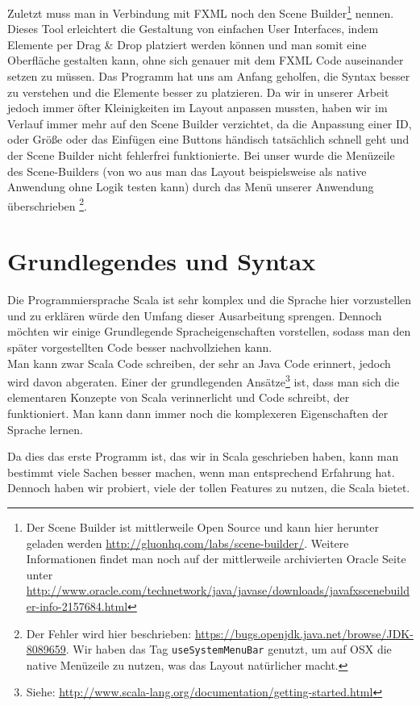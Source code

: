 Zuletzt muss man in Verbindung mit FXML noch den Scene Builder\footnote{Der Scene Builder ist mittlerweile Open Source und kann hier herunter geladen werden \url{http://gluonhq.com/labs/scene-builder/}. Weitere Informationen findet man noch auf der mittlerweile archivierten Oracle Seite unter \url{http://www.oracle.com/technetwork/java/javase/downloads/javafxscenebuilder-info-2157684.html}} nennen. Dieses Tool erleichtert die Gestaltung von einfachen User Interfaces, indem Elemente per Drag \& Drop platziert werden können und man somit eine Oberfläche gestalten kann, ohne sich genauer mit dem FXML Code auseinander setzen zu müssen. Das Programm hat uns am Anfang geholfen, die Syntax besser zu verstehen und die Elemente besser zu platzieren. Da wir in unserer Arbeit jedoch immer öfter Kleinigkeiten im Layout anpassen mussten, haben wir im Verlauf immer mehr auf den Scene Builder verzichtet, da die Anpassung einer ID, oder Größe oder das Einfügen eine Buttons händisch tatsächlich schnell geht und der Scene Builder nicht fehlerfrei funktionierte. Bei unser wurde die Menüzeile des Scene-Builders (von wo aus man das Layout beispielsweise als native Anwendung ohne Logik testen kann) durch das Menü unserer Anwendung überschrieben \footnote{Der Fehler wird hier beschrieben: \url{https://bugs.openjdk.java.net/browse/JDK-8089659}. Wir haben das Tag \texttt{useSystemMenuBar} genutzt, um auf OSX die native Menüzeile zu nutzen, was das Layout natürlicher macht.}.

\section{Grundlegendes und Syntax}
Die Programmiersprache Scala ist sehr komplex und die Sprache hier vorzustellen und zu erklären würde den Umfang dieser Ausarbeitung sprengen. Dennoch möchten wir einige Grundlegende Spracheigenschaften vorstellen, sodass man den später vorgestellten Code besser nachvollziehen kann.\\
Man kann zwar Scala Code schreiben, der sehr an Java Code erinnert, jedoch wird davon abgeraten. Einer der grundlegenden Ansätze\footnote{Siehe: \url{http://www.scala-lang.org/documentation/getting-started.html}} ist, dass man sich die elementaren Konzepte von Scala verinnerlicht und Code schreibt, der funktioniert. Man kann dann immer noch die komplexeren Eigenschaften der Sprache lernen.

Da dies das erste Programm ist, das wir in Scala geschrieben haben, kann man bestimmt viele Sachen besser machen, wenn man entsprechend Erfahrung hat. Dennoch haben wir probiert, viele der tollen Features zu nutzen, die Scala bietet.

